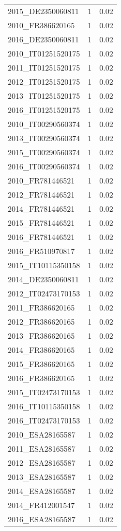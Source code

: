 \begin{table*}[htbp]
\begin{tabular}{lrr}
2015_DE2350060811 & 1 & 0.02 \\
2010_FR386620165 & 1 & 0.02 \\
2016_DE2350060811 & 1 & 0.02 \\
2010_IT01251520175 & 1 & 0.02 \\
2011_IT01251520175 & 1 & 0.02 \\
2012_IT01251520175 & 1 & 0.02 \\
2013_IT01251520175 & 1 & 0.02 \\
2016_IT01251520175 & 1 & 0.02 \\
2010_IT00290560374 & 1 & 0.02 \\
2013_IT00290560374 & 1 & 0.02 \\
2015_IT00290560374 & 1 & 0.02 \\
2016_IT00290560374 & 1 & 0.02 \\
2010_FR781446521 & 1 & 0.02 \\
2012_FR781446521 & 1 & 0.02 \\
2014_FR781446521 & 1 & 0.02 \\
2015_FR781446521 & 1 & 0.02 \\
2016_FR781446521 & 1 & 0.02 \\
2016_FR510970817 & 1 & 0.02 \\
2015_IT10115350158 & 1 & 0.02 \\
2014_DE2350060811 & 1 & 0.02 \\
2012_IT02473170153 & 1 & 0.02 \\
2011_FR386620165 & 1 & 0.02 \\
2012_FR386620165 & 1 & 0.02 \\
2013_FR386620165 & 1 & 0.02 \\
2014_FR386620165 & 1 & 0.02 \\
2015_FR386620165 & 1 & 0.02 \\
2016_FR386620165 & 1 & 0.02 \\
2015_IT02473170153 & 1 & 0.02 \\
2016_IT10115350158 & 1 & 0.02 \\
2016_IT02473170153 & 1 & 0.02 \\
2010_ESA28165587 & 1 & 0.02 \\
2011_ESA28165587 & 1 & 0.02 \\
2012_ESA28165587 & 1 & 0.02 \\
2013_ESA28165587 & 1 & 0.02 \\
2014_ESA28165587 & 1 & 0.02 \\
2014_FR412001547 & 1 & 0.02 \\
2016_ESA28165587 & 1 & 0.02 \\

\end{tabular}
\end{table*}

